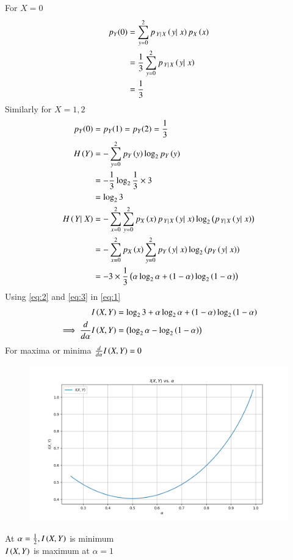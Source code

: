 \documentclass[article]{IEEEtran}
\theoremstyle{remark}
\begin{document}
For $X=0$
\begin{align}
p_Y(0) &= \sum_{y=0}^2 p_{\left.{Y}|\right.{X}}\left({\left.{y}|\right.{x}}\right)p_X\left(x\right)\\
&= \frac{1}{3}\sum_{y=0}^2p_{\left.{Y}|\right.{X}}\left({\left.{y}|\right.{x}}\right)\\
&= \frac{1}{3}
\end{align}
Similarly for $X=1,2$
\begin{align}
p_Y(0) &= p_Y(1) = p_Y(2) =\frac{1}{3}\\
H\left(Y\right) &= - \sum_{y=0}^2p_Y\left(y\right) \log_2p_Y\left(y\right)\\
&= -\frac{1}{3}\log_2\frac{1}{3} \times 3\\
&= \log_23\label{eq:2}\\
H\left(\left.{Y}|\right.{X}\right) &= -\sum_{x=0}^2 \sum_{y=0}^2p_X\left(x\right)p_{\left.{Y}|\right.{X}}\left({\left.{y}|\right.{x}}\right)\log_2\left(p_{\left.{Y}|\right.{X}}\left({\left.{y}|\right.{x}}\right)\right)\\
&=-\sum_{x=0}^2p_X\left(x\right)\sum_{y=0}^2p_{Y}\left({\left.{y}|\right.{x}}\right)\log_2\left(p_{Y}\left({\left.{y}|\right.{x}}\right)\right)\\
&=-3\times\frac{1}{3}\left(\alpha\log_2\alpha+\left(1-\alpha\right)\log_2\left(1-\alpha\right)\right)\label{eq:3}
\end{align}
Using \eqref{eq:2} and \eqref{eq:3} in \eqref{eq:1}
\begin{align}
I\left(X,Y\right)&= \log_23 + \alpha\log_2\alpha+\left(1-\alpha\right)\log_2\left(1-\alpha\right)\\
\implies \frac{d}{d\alpha}I\left(X,Y\right) &= \left(\log_2 \alpha - \log_2\left(1-\alpha\right)\right)
\end{align}
For maxima or minima $\frac{d}{d\alpha}I\left(X,Y\right) = 0$
\begin{figure}[!ht]
\centering
\includegraphics[width=\columnwidth]{./figs/figure2.png}
\label{Fig:2}
\end{figure}

At $\alpha = \frac{1}{2}, I\left(X,Y\right)$ is minimum\\
$I\left(X,Y\right)$ is maximum at $\alpha = 1$\\
\end{document}
